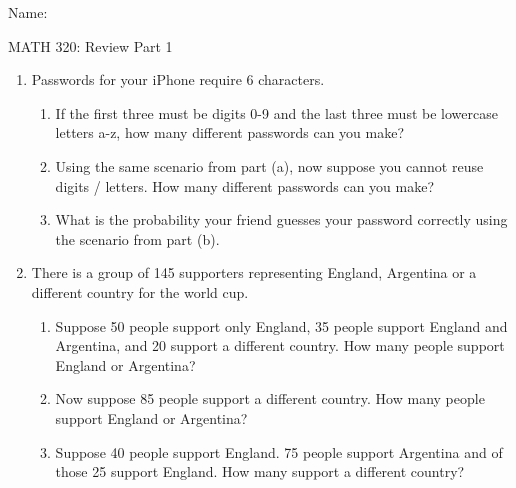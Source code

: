 \documentclass{article}
\begin{document}
\hspace{375pt}Name:

\begin{center}
{\Huge MATH 320: Review Part 1}

\end{center}


\bigskip\bigskip

\begin{enumerate}
    \item Passwords for your iPhone require 6 characters.\bigskip
    \begin{enumerate}
        \item If the first three must be digits 0-9 and the last three must be lowercase letters a-z, how many different passwords can you make?\vspace{30pt}
        \item Using the same scenario from part (a), now suppose you cannot reuse digits / letters. How many different passwords can you make?\vspace{30pt}
        \item What is the probability your friend guesses your password correctly using the scenario from part (b).\vspace{30pt}
    \end{enumerate}\bigskip
    
    \item There is a group of 145 supporters representing England, Argentina or a different country for the world cup.\bigskip
    \begin{enumerate}
       \item Suppose 50 people support only England, 35 people support England and Argentina, and 20 support a different country. How many people support England or Argentina?\vspace{80pt}
       \item Now suppose 85 people support a different country. How many people support  England or Argentina?\vspace{80pt}
       \item Suppose 40 people support England. 75 people support Argentina and of those 25 support England. How many support a different country?\vspace{80pt}
   \end{enumerate}\bigskip
   

\end{enumerate}
\end{document}
